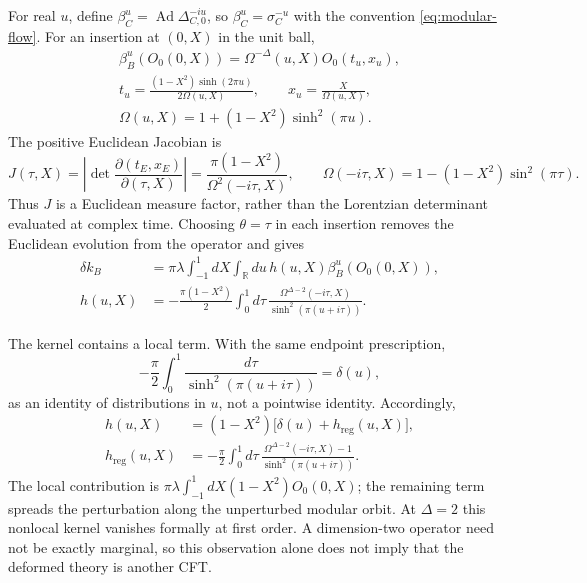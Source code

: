 \documentclass[a4paper,11pt]{article}
\theoremstyle{definition}
\begin{document}
For real $u$, define $\beta_C^u=\operatorname{Ad}\Delta_{C,0}^{-iu}$, so $\beta_C^u=\sigma_C^{-u}$ with the convention \eqref{eq:modular-flow}. For an insertion at $(0,X)$ in the unit ball,
\begin{gather}
 \beta_B^u(O_0(0,X))=\Omega^{-\Delta}(u,X)O_0(t_u,x_u),\nonumber\\
 t_u=\frac{(1-X^2)\sinh(2\pi u)}{2\Omega(u,X)},
 \qquad x_u=\frac{X}{\Omega(u,X)},\nonumber\\
 \Omega(u,X)=1+(1-X^2)\sinh^2(\pi u).
 \label{eq:cpt-ball-flow}
\end{gather}
The positive Euclidean Jacobian is
\begin{equation}
 J(\tau,X)=\left|\det\frac{\partial(t_E,x_E)}{\partial(\tau,X)}\right|
 =\frac{\pi(1-X^2)}{\Omega^2(-i\tau,X)},
 \qquad \Omega(-i\tau,X)=1-(1-X^2)\sin^2(\pi\tau).
 \label{eq:cpt-euclidean-jacobian}
\end{equation}
Thus $J$ is a Euclidean measure factor, rather than the Lorentzian determinant evaluated at complex time. Choosing $\theta=\tau$ in each insertion removes the Euclidean evolution from the operator and gives
\begin{align}
 \delta k_B&=\pi\lambda\int_{-1}^1dX\int_{\mathbb R}du\,
 h(u,X)\beta_B^u(O_0(0,X)),\label{eq:deltaK}\\
 h(u,X)&=-\frac{\pi(1-X^2)}{2}\int_0^1d\tau\,
 \frac{\Omega^{\Delta-2}(-i\tau,X)}{\sinh^2(\pi(u+i\tau))}.
 \label{eq:cpt-h-kernel}
\end{align}

The kernel contains a local term. With the same endpoint prescription,
\begin{equation}
 -\frac{\pi}{2}\int_0^1\frac{d\tau}{\sinh^2(\pi(u+i\tau))}=\delta(u),
 \label{eq:cpt-delta-kernel}
\end{equation}
as an identity of distributions in $u$, not a pointwise identity. Accordingly,
\begin{align}
 h(u,X)&=(1-X^2)\bigl[\delta(u)+h_{\mathrm{reg}}(u,X)\bigr],\nonumber\\
 h_{\mathrm{reg}}(u,X)&=-\frac{\pi}{2}\int_0^1d\tau\,
 \frac{\Omega^{\Delta-2}(-i\tau,X)-1}{\sinh^2(\pi(u+i\tau))}.
 \label{eq:cpt-regular-kernel}
\end{align}
The local contribution is $\pi\lambda\int_{-1}^1dX(1-X^2)O_0(0,X)$; the remaining term spreads the perturbation along the unperturbed modular orbit. At $\Delta=2$ this nonlocal kernel vanishes formally at first order. A dimension-two operator need not be exactly marginal, so this observation alone does not imply that the deformed theory is another CFT.
\end{document}
